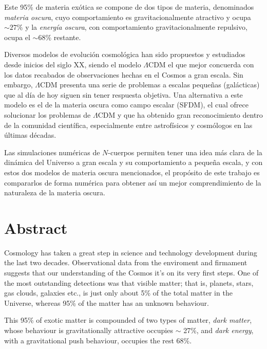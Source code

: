 \documentclass[a4paper,openright,10pt, oneside, final]{book}
\begin{document}
Este 95\% de materia exótica se compone de dos tipos de materia, denominados \textit{materia oscura}, cuyo comportamiento es gravitacionalmente atractivo y ocupa $\sim 27\% $ y  la \textit{energía oscura}, con comportamiento gravitacionalmente repulsivo, ocupa el $\sim 68\%$ restante. 

Diversos modelos de evolución cosmológica han sido propuestos y estudiados desde inicios del siglo XX, siendo el modelo $\Lambda$CDM el que mejor concuerda con los datos recabados de observaciones hechas en el Cosmos a gran escala. Sin embargo, $\Lambda$CDM presenta una serie de problemas a escalas pequeñas (galácticas) que al día de hoy siguen sin tener respuesta objetiva. Una alternativa a este modelo es el de la materia oscura como campo escalar (SFDM), el cual ofrece solucionar los problemas de $\Lambda$CDM y que ha obtenido gran reconocimiento dentro de la comunidad científica, especialmente entre astrofísicos y cosmólogos en las últimas décadas.

Las simulaciones numéricas de $N$-cuerpos permiten tener una idea más clara de la dinámica del Universo a gran escala y su comportamiento a pequeña escala, y con estos dos modelos de materia oscura mencionados, el propósito de este trabajo es compararlos de forma numérica para obtener así un mejor comprendimiento de la naturaleza de la materia oscura.
\thispagestyle{empty}

\chapter*{Abstract} %

Cosmology has taken a great step in science and technology development during the last two decades. Observational data from the enviroment and firmament suggests that our understanding of the Cosmos it's on its very first steps. One of the most outstanding detections was that visible matter; that is, planets, stars, gas clouds, galaxies etc., is just only about 5\% of the total matter in the Universe, whereas 95\% of the matter has an unknown behaviour.

This 95\% of exotic matter is compounded of two types of matter, \textit{dark matter}, whose behaviour is gravitationally attractive occupies $\sim$ 27\%, and \textit{dark energy}, with a gravitational push behaviour, occupies the rest 68\%.
\end{document}
